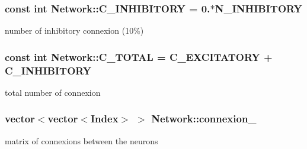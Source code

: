 \hypertarget{classNetwork_a07869bbf76df13dc02f460967777f687}{
\subsubsection[{C\-\_\-\-I\-N\-H\-I\-B\-I\-T\-O\-R\-Y}]{\setlength{\rightskip}{0pt plus 5cm}const int Network\-::\-C\-\_\-\-I\-N\-H\-I\-B\-I\-T\-O\-R\-Y = 0.$\ast${\bf N\-\_\-\-I\-N\-H\-I\-B\-I\-T\-O\-R\-Y}\hspace{0.3cm}{\ttfamily [private]}}}\label{classNetwork_a07869bbf76df13dc02f460967777f687}


number of inhibitory connexion (10\%) 

\hypertarget{classNetwork_a692a8e65e5f6f098c6569c348b1aa5d1}{
\subsubsection[{C\-\_\-\-T\-O\-T\-A\-L}]{\setlength{\rightskip}{0pt plus 5cm}const int Network\-::\-C\-\_\-\-T\-O\-T\-A\-L = {\bf C\-\_\-\-E\-X\-C\-I\-T\-A\-T\-O\-R\-Y} + {\bf C\-\_\-\-I\-N\-H\-I\-B\-I\-T\-O\-R\-Y}\hspace{0.3cm}{\ttfamily [private]}}}\label{classNetwork_a692a8e65e5f6f098c6569c348b1aa5d1}


total number of connexion 

\hypertarget{classNetwork_aa6e3e23d543791c50b6010bfb223b12d}{
\subsubsection[{connexion\-\_\-}]{\setlength{\rightskip}{0pt plus 5cm}vector$<$vector$<${\bf Index}$>$ $>$ Network\-::connexion\-\_\-\hspace{0.3cm}{\ttfamily [private]}}}\label{classNetwork_aa6e3e23d543791c50b6010bfb223b12d}


matrix of connexions between the neurons 

